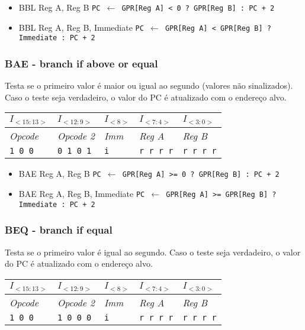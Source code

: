 \documentclass[11pt,a4paper]{report}
\begin{document}
\begin{itemize}
\item BBL Reg A, Reg B
\subitem \texttt{PC $\leftarrow$ GPR[Reg A] < 0 ? GPR[Reg B] : PC + 2}
\item BBL Reg A, Reg B, Immediate
\subitem \texttt{PC $\leftarrow$ GPR[Reg A] < GPR[Reg B] ? Immediate :  PC + 2}
\end{itemize}

\subsubsection{BAE - branch if above or equal}
Testa se o primeiro valor é maior ou igual ao segundo (valores não
sinalizados). Caso o teste seja verdadeiro, o valor do PC é atualizado
com o endereço alvo.

\begin{table}[htb!]
\centering
\begin{tabular}{|p{2cm}|p{2cm}|p{2cm}|p{2cm}|p{2cm}|}
\hline
$I_{<15:13>}$ & $I_{<12:9>}$ & $I_{<8>}$ & $I_{<7:4>}$ & $I_{<3:0>}$  \\ \hline
\textit{Opcode} & \textit{Opcode 2} & \textit{Imm} & \textit{Reg A} & \textit{Reg B} \\ \hline
\texttt{1 0 0} & \texttt{0 1 0 1} & \texttt{i} & \texttt{r r r r} & \texttt{r r r r} \\ \hline
\end{tabular}
\end{table}

\begin{itemize}
\item BAE Reg A, Reg B
\subitem \texttt{PC $\leftarrow$ GPR[Reg A] >= 0 ? GPR[Reg B] : PC + 2}
\item BAE Reg A, Reg B, Immediate
\subitem \texttt{PC $\leftarrow$ GPR[Reg A] >= GPR[Reg B] ? Immediate :  PC + 2}
\end{itemize}

\subsubsection{BEQ - branch if equal}
Testa se o primeiro valor é igual ao segundo. Caso o teste seja
verdadeiro, o valor do PC é atualizado com o endereço alvo.

\begin{table}[htb!]
\centering
\begin{tabular}{|p{2cm}|p{2cm}|p{2cm}|p{2cm}|p{2cm}|}
\hline
$I_{<15:13>}$ & $I_{<12:9>}$ & $I_{<8>}$ & $I_{<7:4>}$ & $I_{<3:0>}$  \\ \hline
\textit{Opcode} & \textit{Opcode 2} & \textit{Imm} & \textit{Reg A} & \textit{Reg B} \\ \hline
\texttt{1 0 0} & \texttt{1 0 0 0} & \texttt{i} & \texttt{r r r r} & \texttt{r r r r} \\ \hline
\end{tabular}
\end{table}
\end{document}

